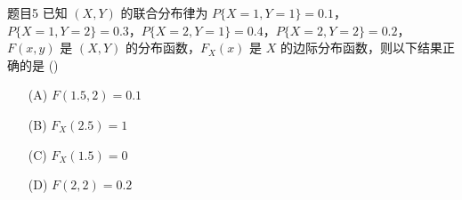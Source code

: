 \begin{question}{题目5}
    已知 $(X,Y)$ 的联合分布律为 $P\{X=1, Y=1\} = 0.1$，$P\{X=1, Y=2\} = 0.3$，$P\{X=2, Y=1\}=0.4$，$P\{X=2, Y=2\}=0.2$，$F(x,y)$ 是 $(X,Y)$ 的分布函数，$F_X(x)$ 是 $X$ 的边际分布函数，则以下结果正确的是 (\quad \quad)
    \begin{multicols}{4}
        \begin{itemize}
            \item [(A)] $F(1.5, 2) = 0.1$
            \item [(B)] $F_X(2.5) = 1$
            \item [(C)] $F_X(1.5) = 0$
            \item [(D)] $F(2,2) = 0.2$
        \end{itemize}
    \end{multicols}
\end{question}
